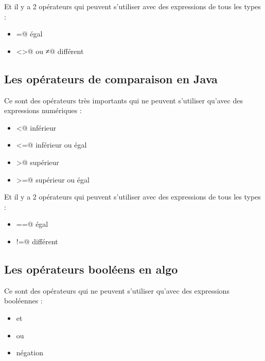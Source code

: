 \documentclass[11pt,a4paper]{article}
\begin{document}
          Et il y a 2 op\'erateurs qui peuvent s'utiliser avec des expressions de tous les types :
          
					\begin{itemize}
				
			\item \verb@=@ \'egal 
			\item \verb@<>@ ou \verb@≠@ diff\'erent 
					\end{itemize}
				
            \par
        \subsection{Les op\'erateurs de comparaison en Java}
          Ce sont des op\'erateurs tr\`es importants qui ne peuvent s'utiliser qu'avec des expressions num\'eriques :
          
					\begin{itemize}
				
			\item \verb@<@ inf\'erieur 
			\item \verb@<=@ inf\'erieur ou \'egal 
			\item \verb@>@ sup\'erieur 
			\item \verb@>=@ sup\'erieur ou \'egal 
					\end{itemize}
				
          Et il y a 2 op\'erateurs qui peuvent s'utiliser avec des expressions de tous les types :
          
					\begin{itemize}
				
			\item \verb@==@ \'egal 
			\item \verb@!=@ diff\'erent 
					\end{itemize}
				
            \par
        \subsection{Les op\'erateurs bool\'eens en algo}
          Ce sont des op\'erateurs qui ne peuvent s'utiliser qu'avec des expressions bool\'eennes :
          
					\begin{itemize}
				
			\item \verb@ET@ et 
			\item \verb@OU@ ou 
			\item \verb@NON@ n\'egation 
					\end{itemize}
				
\end{document}
